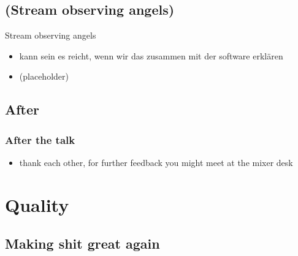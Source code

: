 \documentclass[hyperref={pdfpagelabels=false}]{beamer}
\begin{document}
\subsection{(Stream observing angels)} %
\begin{frame}{Stream observing angels}
\begin{itemize}
\item  kann sein es reicht, wenn wir das  zusammen mit der software erklären
\item  (placeholder)
\end{itemize} 
\end{frame}

\subsection{After} %
\begin{frame}
\frametitle{After the talk}
\begin{itemize}
\item thank each other, for further feedback you might meet at the mixer desk
\end{itemize} 
\end{frame}

\section{Quality} 
\subsection{Making shit great again} 
\begin{frame}
\end{frame}
\end{document}
